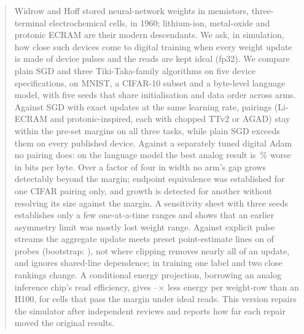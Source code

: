 \begin{abstract}
Widrow and Hoff stored neural-network weights in memistors, three-terminal electrochemical cells, in 1960; lithium-ion,
metal-oxide and protonic ECRAM are their modern descendants. We ask, in simulation, how close such devices come to digital
training when every weight update is made of device pulses and the reads are kept ideal (fp32). We compare plain SGD and three
Tiki-Taka-family algorithms on five device specifications, on MNIST, a CIFAR-10 subset and a byte-level language model, with five
seeds that share initialisation and data order across arms. Against SGD with exact updates at the same learning rate,
\RVAllThreeFpN{} pairings (Li-ECRAM and protonic-inspired, each with chopped TTv2 or AGAD) stay within the pre-set margins on all
three tasks, while plain SGD exceeds them on every published device. Against a separately tuned digital Adam no pairing does: on
the language model the best analog result is \RVLmAdamBestGap\,\% worse in bits per byte. Over a factor of four in width no
arm's gap grows detectably beyond the margin; endpoint equivalence was established for one CIFAR pairing only, and growth is detected for another without resolving its size against the margin. A sensitivity sheet with three seeds establishes only a few one-at-a-time
ranges and shows that an earlier asymmetry limit was mostly lost weight range. Against explicit pulse streams the aggregate
update meets preset point-estimate lines on \RYProbeSurMeetsN{} of \RYProbeN{} probes (bootstrap:
\RYProbeSurAtNinetyFiveN), not where clipping removes nearly all of an
update, and ignores shared-line dependence; in training one label and two close rankings change. A conditional energy projection, borrowing an analog inference chip's read efficiency, gives
\RVenSysMin--\RVenChipMax$\times$ less energy per weight-row than an H100, for cells that pass the margin under ideal reads. This
version repairs the simulator after independent reviews and reports how far each repair moved the original results.
\end{abstract}
